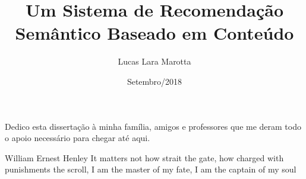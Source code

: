 \documentclass[pt,twoside,onehalfspacing,bsc]{risethesis}
\title{Um Sistema de Recomendação Semântico Baseado em Conteúdo}
\date{Setembro/2018}
\author{Lucas Lara Marotta}
\begin{document}
\frontmatter
\frontpage
\presentationpage

\begin{dedicatory}
Dedico esta dissertação à minha família, amigos e professores que me deram todo o apoio necessário para chegar até aqui.
\end{dedicatory}

\begin{epigraph}[]{William Ernest Henley}
It matters not how strait the gate, how charged with punishments the scroll, I am the master of my fate, I am the captain of my soul
\end{epigraph}

\resumo


\abstract


\tableofcontents

\listoffigures

\listoftables

\listofacronyms


\lstlistoflistings

\mainmatter










%
\end{document}
